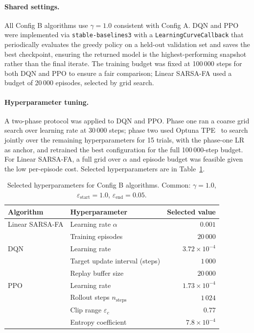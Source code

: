 \documentclass[11pt,a4paper]{article}
\begin{document}
\paragraph{Shared settings.}
All Config B algorithms use $\gamma = 1.0$ consistent with Config A. DQN and PPO
were implemented via \texttt{stable-baselines3} with a \texttt{LearningCurveCallback}
that periodically evaluates the greedy policy on a held-out validation set and
saves the best checkpoint, ensuring the returned model is the highest-performing
snapshot rather than the final iterate. The training budget was fixed at 100\,000
steps for both DQN and PPO to ensure a fair comparison; Linear SARSA-FA used
a budget of 20\,000 episodes, selected by grid search.

\paragraph{Hyperparameter tuning.}
A two-phase protocol was applied to DQN and PPO. Phase one ran a coarse grid
search over learning rate at 30\,000 steps; phase two used Optuna
TPE~\cite{akiba2019} to search jointly over the remaining hyperparameters for
15 trials, with the phase-one LR as anchor, and retrained the best
configuration for the full 100\,000-step budget. For Linear SARSA-FA, a full
grid over $\alpha$ and episode budget was feasible given the low per-episode
cost. Selected hyperparameters are in Table~\ref{tab:hparam_b}.

\begin{table}[H]
\centering\small
\caption{Selected hyperparameters for Config B algorithms.
         Common: $\gamma=1.0$, $\varepsilon_{\text{start}}=1.0$,
         $\varepsilon_{\text{end}}=0.05$.}
\label{tab:hparam_b}
\begin{tabular}{llr}
\toprule
Algorithm & Hyperparameter & Selected value \\
\midrule
Linear SARSA-FA & Learning rate $\alpha$          & $0.001$ \\
                & Training episodes               & $20\,000$ \\
\midrule
DQN             & Learning rate                   & $3.72 \times 10^{-4}$ \\
                & Target update interval (steps)  & $1\,000$ \\
                & Replay buffer size              & $20\,000$ \\
\midrule
PPO             & Learning rate                   & $1.73 \times 10^{-4}$ \\
                & Rollout steps $n_{\text{steps}}$& $1\,024$ \\
                & Clip range $\varepsilon_c$      & $0.77$ \\
                & Entropy coefficient             & $7.8 \times 10^{-4}$ \\
\bottomrule
\end{tabular}
\end{table}
\end{document}
